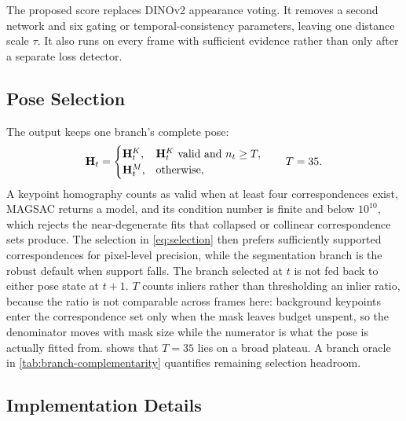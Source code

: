 \documentclass[10pt,twocolumn,letterpaper]{article}
\begin{document}
The proposed score replaces DINOv2 appearance voting.
It removes a second network and six gating or temporal-consistency parameters, leaving one distance scale $\tau$.
It also runs on every frame with sufficient evidence rather than only after a separate loss detector.

\subsection{Pose Selection}
\label{sec:pose-selection}

The output keeps one branch's complete pose:
\begin{equation}
    \mathbf{H}_t =
    \begin{cases}
        \mathbf{H}^{K}_t, & \mathbf{H}^{K}_t\text{ valid and }n_t\geq T,\\
        \mathbf{H}^{M}_t, & \text{otherwise},
    \end{cases}
    \qquad T=35.
    \label{eq:selection}
\end{equation}
A keypoint homography counts as valid when at least four correspondences exist, MAGSAC returns a model, and its condition number is finite and below $10^{10}$, which rejects the near-degenerate fits that collapsed or collinear correspondence sets produce.
The selection in \cref{eq:selection} then prefers sufficiently supported correspondences for pixel-level precision, while the segmentation branch is the robust default when support falls.
The branch selected at $t$ is not fed back to either pose state at $t+1$.
$T$ counts inliers rather than thresholding an inlier ratio, because the ratio is not comparable across frames here: background keypoints enter the correspondence set only when the mask leaves budget unspent, so the denominator moves with mask size while the numerator is what the pose is actually fitted from.
 shows that $T=35$ lies on a broad plateau.
A branch oracle in \cref{tab:branch-complementarity} quantifies remaining selection headroom.

\subsection{Implementation Details}
\label{sec:implementation}
\end{document}
